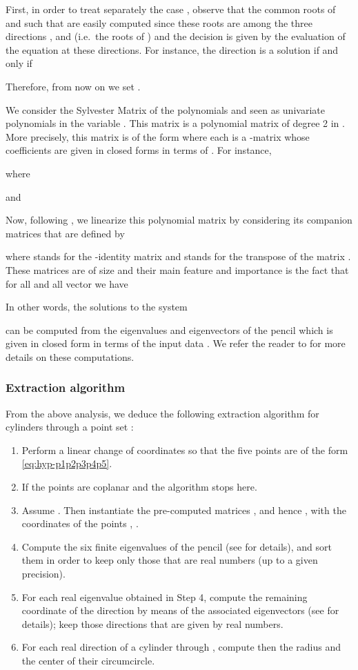 \documentclass[5p]{elsarticle}
\newcommand{\com}[1]{{\color{black} #1}}
\begin{document}
\medskip

First, in order to treat \com{separately} the case , observe that the common roots of  and  such that  are easily computed since \com{these roots} are among the three directions ,  and  (i.e.~the roots of ) and the decision is given by the evaluation of the equation  at these directions. For instance, the direction  is a solution if and only if 

Therefore, from now on we set . 

We consider the Sylvester Matrix  of the polynomials  and  seen as univariate polynomials in the variable . This matrix is a polynomial matrix of degree 2 in . More precisely, \com{this matrix} is of the form  where each  is a -matrix whose coefficients are given in closed forms in terms of . For instance, 

where 

and
	
Now, following \cite{BKM05}, we linearize this polynomial matrix by considering its companion matrices that are defined by 

where  stands for the -identity matrix and  stands for the transpose of the matrix . These matrices are of size  and their main feature and importance is the fact that for all  and all vector  we have
 
In other words, the solutions to the system 
 
can be computed from the eigenvalues and eigenvectors of the pencil  which is given in closed form in terms of the input data . We refer the reader to \cite{BKM05} for more details on these computations. 
 
\subsubsection{Extraction algorithm} 

From the above analysis, we deduce the following extraction algorithm \com{for cylinders} through a point set :
\begin{enumerate}
	\item Perform a linear change of coordinates so that the five points are of the form \eqref{eq:hyp-p1p2p3p4p5}. 
	\item If  the points are coplanar and the algorithm stops here.  
	\item Assume . \com{Then instantiate} the pre-computed matrices , and hence  , with the coordinates of the points , . 
	\item Compute the six finite eigenvalues of the pencil  (see \cite{BKM05} for details), and sort them in order to keep only those \com{that} are real numbers (up to a given precision).  
	\item For each real eigenvalue obtained \com{in Step 4}, compute the remaining coordinate of the direction by means of the associated eigenvectors (see \cite{BKM05} for details); keep those directions that are given by real numbers.
	\item For each real direction of a cylinder through , compute  then the radius and the center of their circumcircle.
\end{enumerate} 
\end{document}
